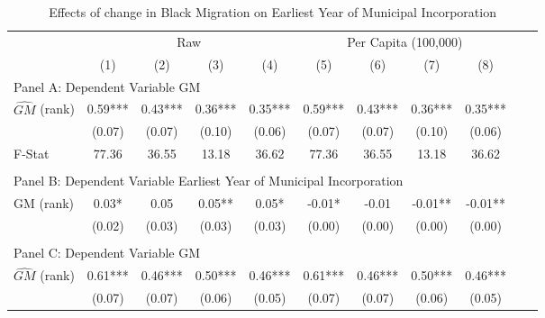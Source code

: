  \begin{table}[htbp]\centering {} \begin{threeparttable} \caption{Effects of change in Black Migration on Earliest Year of Municipal Incorporation} \begin{tabular}{l*{10}{c}} \toprule
                &\multicolumn{4}{c}{Raw}                                    &\multicolumn{4}{c}{Per Capita (100,000)}                   \\\cmidrule(lr){2-5}\cmidrule(lr){6-9}
                &\multicolumn{1}{c}{(1)}   &\multicolumn{1}{c}{(2)}   &\multicolumn{1}{c}{(3)}   &\multicolumn{1}{c}{(4)}   &\multicolumn{1}{c}{(5)}   &\multicolumn{1}{c}{(6)}   &\multicolumn{1}{c}{(7)}   &\multicolumn{1}{c}{(8)}   \\
\cmidrule(lr){1-9}
\multicolumn{8}{l}{Panel A: Dependent Variable GM}\\
\cmidrule(lr){1-9}
$\hat{GM}$ (rank)&       0.59***&       0.43***&       0.36***&       0.35***&       0.59***&       0.43***&       0.36***&       0.35***\\
                &     (0.07)   &     (0.07)   &     (0.10)   &     (0.06)   &     (0.07)   &     (0.07)   &     (0.10)   &     (0.06)   \\
\midrule
F-Stat          &      77.36   &      36.55   &      13.18   &      36.62   &      77.36   &      36.55   &      13.18   &      36.62   \\
\cmidrule[\heavyrulewidth](lr){1-9} \\ \cmidrule[\heavyrulewidth](lr){1-9}
\multicolumn{8}{l}{Panel B: Dependent Variable Earliest Year of Municipal Incorporation}\\
\cmidrule(lr){1-9}
GM  (rank)      &       0.03*  &       0.05   &       0.05** &       0.05*  &      -0.01*  &      -0.01   &      -0.01** &      -0.01** \\
                &     (0.02)   &     (0.03)   &     (0.03)   &     (0.03)   &     (0.00)   &     (0.00)   &     (0.00)   &     (0.00)   \\
\cmidrule[\heavyrulewidth](lr){1-9} \\ \cmidrule[\heavyrulewidth](lr){1-9}
\multicolumn{8}{l}{Panel C: Dependent Variable GM}\\
\cmidrule(lr){1-9}
$\hat{GM}$ (rank)&       0.61***&       0.46***&       0.50***&       0.46***&       0.61***&       0.46***&       0.50***&       0.46***\\
                &     (0.07)   &     (0.07)   &     (0.06)   &     (0.05)   &     (0.07)   &     (0.07)   &     (0.06)   &     (0.05)   \\

\end{tabular}
\end{threeparttable}
\end{table}
